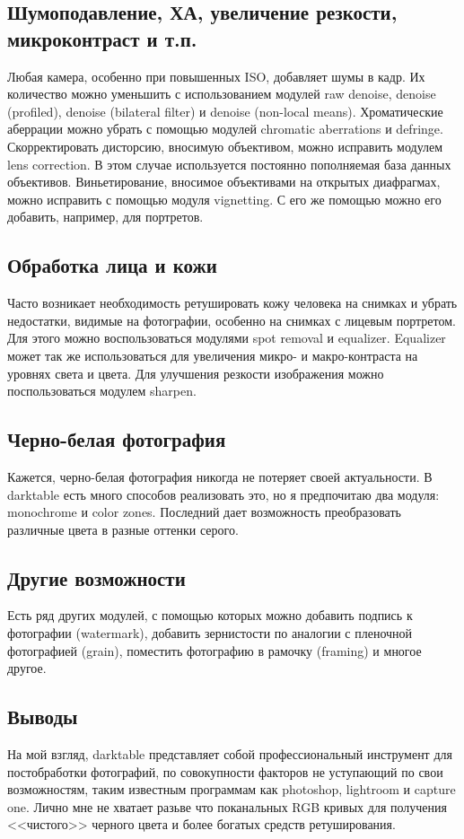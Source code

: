 \documentclass[10pt, a5paper]{article}
\begin{document}
\subsection*{Шумоподавление, ХА, увеличение резкости, микроконтраст и т.п.}

Любая камера, особенно при повышенных ISO, добавляет шумы в кадр. Их
количество можно уменьшить с использованием модулей raw denoise,
denoise (profiled), denoise (bilateral filter) и denoise (non-local
means).  Хроматические аберрации можно убрать с помощью модулей
chromatic aberrations и defringe.  Скорректировать дисторсию, вносимую
объективом, можно исправить модулем lens correction. В этом случае
используется постоянно пополняемая база данных
объективов. Виньетирование, вносимое объективами на открытых
диафрагмах, можно исправить с помощью модуля vignetting. С его же
помощью можно его добавить, например, для портретов.

\subsection*{Обработка лица и кожи}

Часто возникает необходимость ретушировать кожу человека на снимках и
убрать недостатки, видимые на фотографии, особенно на снимках с
лицевым портретом. Для этого можно воспользоваться модулями spot
removal и equalizer. Equalizer может так же использоваться для
увеличения микро- и макро-контраста на уровнях света и цвета. Для
улучшения резкости изображения можно поспользоваться модулем sharpen.

\subsection*{Черно-белая фотография}

Кажется, черно-белая фотография никогда не потеряет своей
актуальности. В darktable есть много способов реализовать это, но я
предпочитаю два модуля: monochrome и color zones. Последний дает
возможность преобразовать различные цвета в разные оттенки серого.

\subsection*{Другие возможности}

Есть ряд других модулей, с помощью которых можно добавить подпись к
фотографии (watermark), добавить зернистости по аналогии с пленочной
фотографией (grain), поместить фотографию в рамочку (framing) и многое
другое.

\subsection*{Выводы}

На мой взгляд, darktable представляет собой профессиональный
инструмент для постобработки фотографий, по совокупности факторов не
уступающий по свои возможностям, таким известным программам как
photoshop, lightroom и capture one. Лично мне не хватает разьве что
поканальных RGB кривых для получения <<чистого>> черного цвета и более
богатых средств ретуширования.
\end{document}
